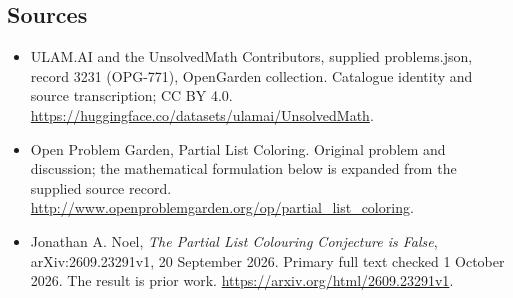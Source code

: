 \documentclass[11pt,a4paper]{article}
\begin{document}
\subsection{Sources}
\begin{itemize}
\item[S1] ULAM.AI and the UnsolvedMath Contributors, supplied problems.json, record 3231 (OPG-771), OpenGarden collection. Catalogue identity and source transcription; CC BY 4.0.
\url{https://huggingface.co/datasets/ulamai/UnsolvedMath}.
\item[S2] Open Problem Garden, Partial List Coloring. Original problem and discussion; the mathematical formulation below is expanded from the supplied source record.
\url{http://www.openproblemgarden.org/op/partial_list_coloring}.
\item[R1] Jonathan A. Noel, \emph{The Partial List Colouring
Conjecture is False}, arXiv:2609.23291v1, 20 September 2026.
Primary full text checked 1 October 2026. The result is prior work.
\url{https://arxiv.org/html/2609.23291v1}.
\end{itemize}
\end{document}
